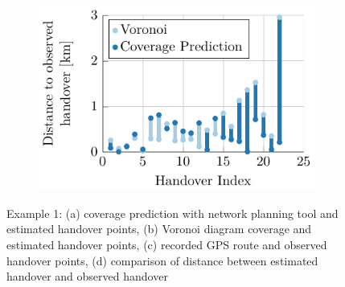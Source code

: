 \documentclass[master,english]{hgbthesis}
\begin{document}
\begin{figure}
\begin{subfigure}[b]{0.5\linewidth}
			\caption{}
			\label{fig:563handover}
		\end{subfigure}%
		~
		\begin{subfigure}[b]{0.5\linewidth}
			\centering
			\includegraphics[width=\textwidth]{./images/563_predvorcomp}
			\caption{}
			\label{fig:563distcomp}
		\end{subfigure}
	\caption{Example 1: (a) coverage prediction with network planning tool and estimated handover points, (b) Voronoi diagram coverage and estimated handover points, (c) recorded GPS route and observed handover points, (d) comparison of distance between estimated handover and observed handover}\label{fig:563overview}
\end{figure}
\end{document}
